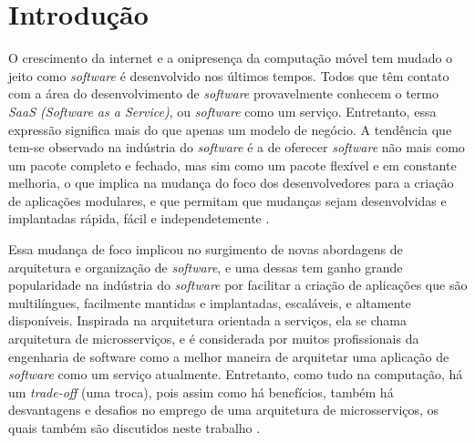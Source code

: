 \chapter{Introdução}\label{chapter-introducao}

O crescimento da internet e a onipresença da computação móvel tem mudado o jeito como \emph{software} é desenvolvido nos últimos tempos. Todos que têm contato com a área do desenvolvimento de \emph{software} provavelmente conhecem o termo \emph{SaaS (Software as a Service)}, ou \emph{software} como um serviço. Entretanto, essa expressão significa mais do que apenas um modelo de negócio. A tendência que tem-se observado na indústria do \emph{software} é a de oferecer \emph{software} não mais como um pacote completo e fechado, mas sim como um pacote flexível e em constante melhoria, o que implica na mudança do foco dos desenvolvedores para a criação de aplicações modulares, e que permitam que mudanças sejam desenvolvidas e implantadas rápida, fácil e independetemente \cite{CAOPLE, oracle_microservices}.

Essa mudança de foco implicou no surgimento de novas abordagens de arquitetura e organização de \emph{software}, e uma dessas tem ganho grande popularidade na indústria do \emph{software} por facilitar a criação de aplicações que são multilíngues, facilmente mantidas e implantadas, escaláveis, e altamente disponíveis. Inspirada na arquitetura orientada a serviços, ela se chama arquitetura de microsserviços, e é considerada por muitos profissionais da engenharia de software como a melhor maneira de arquitetar uma aplicação de \emph{software} como um serviço atualmente. Entretanto, como tudo na computação, há um \emph{trade-off} (uma troca), pois assim como há benefícios, também há desvantagens e desafios no emprego de uma arquitetura de microsserviços, os quais também são discutidos neste trabalho \cite{middleware-microservices,design-monitoring-testing-waseem}.




